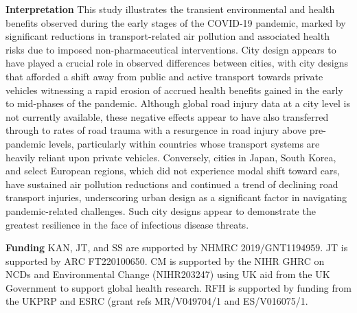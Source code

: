 \documentclass[preprint,10pt]{elsarticle} %
\newcommand{\absdiv}[1]{%
  \par\addvspace{.5\baselineskip}%
  \noindent\textbf{#1}\quad\ignorespaces}
\begin{document}
 \absdiv{\textcolor{OliveGreen}{Interpretation}}
This study illustrates the transient environmental and health benefits observed during the early stages of the COVID-19 pandemic, marked by significant reductions in transport-related air pollution and associated health risks due to imposed non-pharmaceutical interventions. City design appears to have played a crucial role in observed differences between cities, with city designs that afforded a shift away from public and active transport towards private vehicles witnessing a rapid erosion of accrued health benefits gained in the early to mid-phases of the pandemic. Although global road injury data at a city level is not currently available, these negative effects appear to have also transferred through to rates of road trauma with a resurgence in road injury above pre-pandemic levels, particularly within countries whose transport systems are heavily reliant upon private vehicles. Conversely, cities in Japan, South Korea, and select European regions, which did not experience modal shift toward cars, have sustained air pollution reductions and continued a trend of declining road transport injuries, underscoring urban design as a significant factor in navigating pandemic-related challenges. Such city designs appear to demonstrate the greatest resilience in the face of infectious disease threats. 
 \absdiv{\textcolor{OliveGreen}{Funding}}
 KAN, JT, and SS are supported by NHMRC 2019/GNT1194959. JT is supported by ARC FT220100650. CM is supported by the NIHR GHRC on NCDs and Environmental Change (NIHR203247) using UK aid from the UK Government to support global health research. RFH is supported by funding from the UKPRP and ESRC (grant refs MR/V049704/1 and ES/V016075/1.
\end{document}
